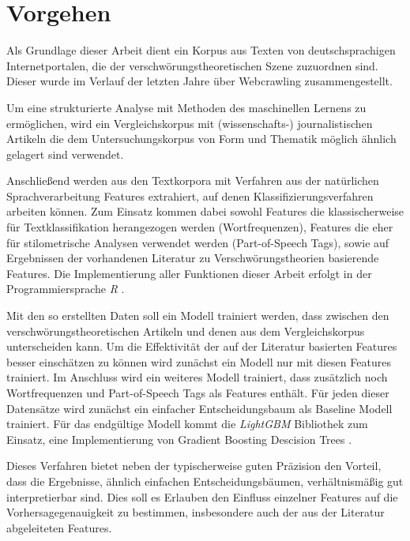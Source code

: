 \section{Vorgehen}

Als Grundlage dieser Arbeit dient ein Korpus aus Texten von deutschsprachigen Internetportalen, die der verschwörungstheoretischen Szene zuzuordnen sind.
Dieser wurde im Verlauf der letzten Jahre über Webcrawling zusammengestellt.

Um eine strukturierte Analyse mit Methoden des maschinellen Lernens zu ermöglichen, wird ein Vergleichskorpus mit (wissenschafts-) journalistischen Artikeln die dem Untersuchungskorpus von Form und Thematik möglich ähnlich gelagert sind verwendet.

Anschließend werden aus den Textkorpora mit Verfahren aus der natürlichen Sprachverarbeitung Features extrahiert, auf denen Klassifizierungsverfahren arbeiten können.
Zum Einsatz kommen dabei sowohl Features die klassischerweise für Textklassifikation herangezogen werden (Wortfrequenzen), Features die eher für stilometrische Analysen verwendet werden (Part-of-Speech Tags), sowie auf Ergebnissen der vorhandenen Literatur zu Verschwörungstheorien basierende Features.
Die Implementierung aller Funktionen dieser Arbeit erfolgt in der Programmiersprache \textit{R} \parencite{r_2021}.

Mit den so erstellten Daten soll ein Modell trainiert werden, dass zwischen den verschwörungstheoretischen Artikeln und denen aus dem Vergleichskorpus unterscheiden kann.
Um die Effektivität der auf der Literatur basierten Features besser einschätzen zu können wird zunächst ein Modell nur mit diesen Features trainiert.
Im Anschluss wird ein weiteres Modell trainiert, dass zusätzlich noch Wortfrequenzen und Part-of-Speech Tags als Features enthält.
Für jeden dieser Datensätze wird zunächst ein einfacher Entscheidungsbaum als Baseline Modell trainiert.
Für das endgültige Modell kommt die \textit{LightGBM} Bibliothek \parencite[][]{lightgbm} zum Einsatz, eine Implementierung von Gradient Boosting Descision Trees \parencite{friedman_2002}.

Dieses Verfahren bietet neben der typischerweise guten Präzision den Vorteil, dass die Ergebnisse, ähnlich einfachen Entscheidungsbäumen, verhältnismäßig gut interpretierbar sind.
Dies soll es Erlauben den Einfluss einzelner Features auf die Vorhersagegenauigkeit zu bestimmen, insbesondere auch der aus der Literatur abgeleiteten Features.